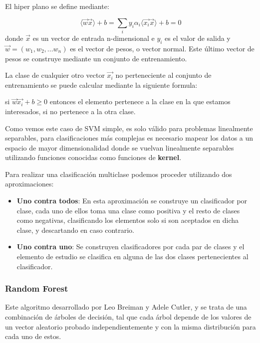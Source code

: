 El hiper plano se define mediante:

\begin{equation}
\langle\overrightarrow{w}\overrightarrow{x}\rangle + b = \sum_iy_i\alpha_i\langle\overrightarrow{x_i}\overrightarrow{x}\rangle + b = 0
\end{equation}
donde \(\overrightarrow{x}\) es un vector de entrada n-dimensional e \(y_i\) es el valor de salida y \(\overrightarrow{w} = (w_1,w_2,...w_n)\) es el vector de pesos, o vector normal. Este último vector de pesos se construye mediante un conjunto de entrenamiento.

La clase de cualquier otro vector \(\overrightarrow{x_i}\) no perteneciente al conjunto de entrenamiento se puede calcular mediante la siguiente formula:

si \(\overrightarrow{w}\overrightarrow{x_i}+b \ge 0\) entonces el elemento pertenece a la clase en la que estamos interesados, si no pertenece a la otra clase.

Como vemos este caso de SVM simple, es solo válido para problemas linealmente separables, para clasificaciones más complejas es necesario mapear los datos a un espacio de mayor dimensionalidad donde se vuelvan linealmente separables utilizando funciones conocidas como funciones de \textbf{kernel}.

Para realizar una clasificación multiclase podemos proceder utilizando dos aproximaciones:

\begin{itemize}
	\item \textbf{Uno contra todos}: En esta aproximación se construye un clasificador por clase, cada uno de ellos toma una clase como positiva y el resto de clases como negativas, clasificando los elementos solo si son aceptados en dicha clase, y descartando en caso contrario.
	\item \textbf{Uno contra uno}: Se construyen clasificadores por cada par de clases y el elemento de estudio se clasifica en alguna de las dos clases pertenecientes al clasificador.
\end{itemize}

\subsubsection{Random Forest}\label{rf}

Este algoritmo desarrollado por Leo Breiman y Adele Cutler, y se trata de una combinación de árboles de decisión, tal que cada árbol depende de los valores de un vector aleatorio probado independientemente y con la misma distribución para cada uno de estos.


